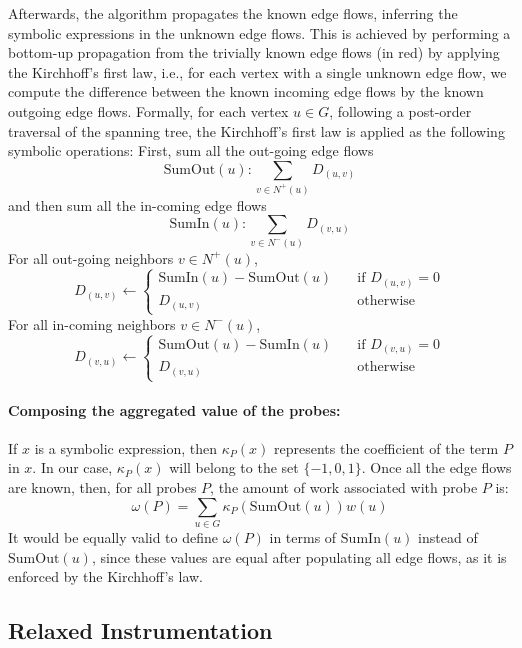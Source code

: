 Afterwards, the algorithm propagates the known edge flows, inferring
the symbolic expressions in the unknown edge flows.
This is achieved by performing a bottom-up propagation from the trivially known
edge flows (in red) by applying the Kirchhoff's first law, i.e.,
for each vertex with a single unknown edge flow, we compute the difference between
the known incoming edge flows by the known outgoing edge flows.
Formally,
for each vertex $u\in G$, following a post-order traversal of the spanning tree,
the Kirchhoff's first law is applied as the following symbolic operations:
First, sum all the out-going edge flows
\[
\mathrm{SumOut}(u): \sum_{v\in N^+(u)} D_{(u,v)}
\]
and then sum all the in-coming edge flows
\[
\mathrm{SumIn}(u): \sum_{v\in N^-(u)} D_{(v,u)}
\]
For all out-going neighbors $v\in N^+(u)$,
\[
D_{(u,v)} \gets
\begin{cases}
    \mathrm{SumIn}(u) - \mathrm{SumOut}(u) & \!\!\!\quad \text{if $D_{(u,v)} = 0$}\\
    D_{(u,v)}       & \!\!\!\quad \text{otherwise}
\end{cases}
\]
For all in-coming neighbors $v\in N^-(u)$,
\[
D_{(v,u)} \gets
\begin{cases}
    \mathrm{SumOut}(u) - \mathrm{SumIn}(u) & \!\!\!\quad \text{if $D_{(v,u)} = 0$}\\
    D_{(v,u)}  & \!\!\!\quad \text{otherwise}
\end{cases}
\]

\paragraph{Composing the aggregated value of the probes:}
If $x$ is a symbolic expression, then $\kappa_P(x)$ represents the coefficient
of the term $P$ in $x$.
In our case, $\kappa_P(x)$ will belong to the set $\{-1,0,1\}$.
Once all the edge flows are known, then, 
for all probes $P$, the amount of work associated
with probe $P$ is:
\[
\omega(P) = \sum_{u\in G} \kappa_P(\mathrm{SumOut}(u))w(u)
\]
It would be equally valid to define $\omega(P)$ in terms of $\mathrm{SumIn}(u)$
instead of $\mathrm{SumOut}(u)$,
since these values are equal after populating all edge flows,
as it is enforced by the Kirchhoff's law.

\subsection{Relaxed Instrumentation}

